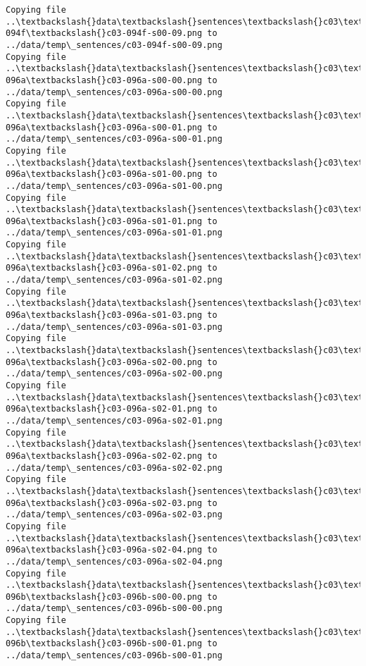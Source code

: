 \documentclass[11pt]{article}
\begin{document}
\begin{Verbatim}[commandchars=\\\{\}]
Copying file ..\textbackslash{}data\textbackslash{}sentences\textbackslash{}c03\textbackslash{}c03-094f\textbackslash{}c03-094f-s00-09.png to
../data/temp\_sentences/c03-094f-s00-09.png
Copying file ..\textbackslash{}data\textbackslash{}sentences\textbackslash{}c03\textbackslash{}c03-096a\textbackslash{}c03-096a-s00-00.png to
../data/temp\_sentences/c03-096a-s00-00.png
Copying file ..\textbackslash{}data\textbackslash{}sentences\textbackslash{}c03\textbackslash{}c03-096a\textbackslash{}c03-096a-s00-01.png to
../data/temp\_sentences/c03-096a-s00-01.png
Copying file ..\textbackslash{}data\textbackslash{}sentences\textbackslash{}c03\textbackslash{}c03-096a\textbackslash{}c03-096a-s01-00.png to
../data/temp\_sentences/c03-096a-s01-00.png
Copying file ..\textbackslash{}data\textbackslash{}sentences\textbackslash{}c03\textbackslash{}c03-096a\textbackslash{}c03-096a-s01-01.png to
../data/temp\_sentences/c03-096a-s01-01.png
Copying file ..\textbackslash{}data\textbackslash{}sentences\textbackslash{}c03\textbackslash{}c03-096a\textbackslash{}c03-096a-s01-02.png to
../data/temp\_sentences/c03-096a-s01-02.png
Copying file ..\textbackslash{}data\textbackslash{}sentences\textbackslash{}c03\textbackslash{}c03-096a\textbackslash{}c03-096a-s01-03.png to
../data/temp\_sentences/c03-096a-s01-03.png
Copying file ..\textbackslash{}data\textbackslash{}sentences\textbackslash{}c03\textbackslash{}c03-096a\textbackslash{}c03-096a-s02-00.png to
../data/temp\_sentences/c03-096a-s02-00.png
Copying file ..\textbackslash{}data\textbackslash{}sentences\textbackslash{}c03\textbackslash{}c03-096a\textbackslash{}c03-096a-s02-01.png to
../data/temp\_sentences/c03-096a-s02-01.png
Copying file ..\textbackslash{}data\textbackslash{}sentences\textbackslash{}c03\textbackslash{}c03-096a\textbackslash{}c03-096a-s02-02.png to
../data/temp\_sentences/c03-096a-s02-02.png
Copying file ..\textbackslash{}data\textbackslash{}sentences\textbackslash{}c03\textbackslash{}c03-096a\textbackslash{}c03-096a-s02-03.png to
../data/temp\_sentences/c03-096a-s02-03.png
Copying file ..\textbackslash{}data\textbackslash{}sentences\textbackslash{}c03\textbackslash{}c03-096a\textbackslash{}c03-096a-s02-04.png to
../data/temp\_sentences/c03-096a-s02-04.png
Copying file ..\textbackslash{}data\textbackslash{}sentences\textbackslash{}c03\textbackslash{}c03-096b\textbackslash{}c03-096b-s00-00.png to
../data/temp\_sentences/c03-096b-s00-00.png
Copying file ..\textbackslash{}data\textbackslash{}sentences\textbackslash{}c03\textbackslash{}c03-096b\textbackslash{}c03-096b-s00-01.png to
../data/temp\_sentences/c03-096b-s00-01.png

\end{Verbatim}
\end{document}
